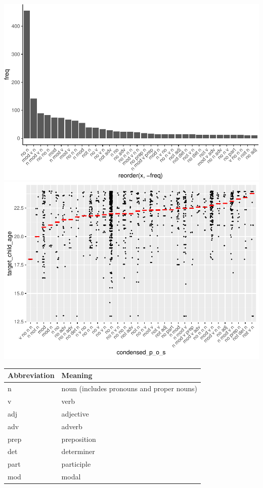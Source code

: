 \documentclass[man]{apa6}
\begin{document}
\includegraphics{negation_production_files/figure-latex/construction-1.pdf}
\includegraphics{negation_production_files/figure-latex/construction-2.pdf}

\begin{longtable}[]{@{}ll@{}}
\toprule
Abbreviation & Meaning\tabularnewline
\midrule
\endhead
n & noun (includes pronouns and proper nouns)\tabularnewline
v & verb\tabularnewline
adj & adjective\tabularnewline
adv & adverb\tabularnewline
prep & preposition\tabularnewline
det & determiner\tabularnewline
part & participle\tabularnewline
mod & modal\tabularnewline
\bottomrule
\end{longtable}
\end{document}
